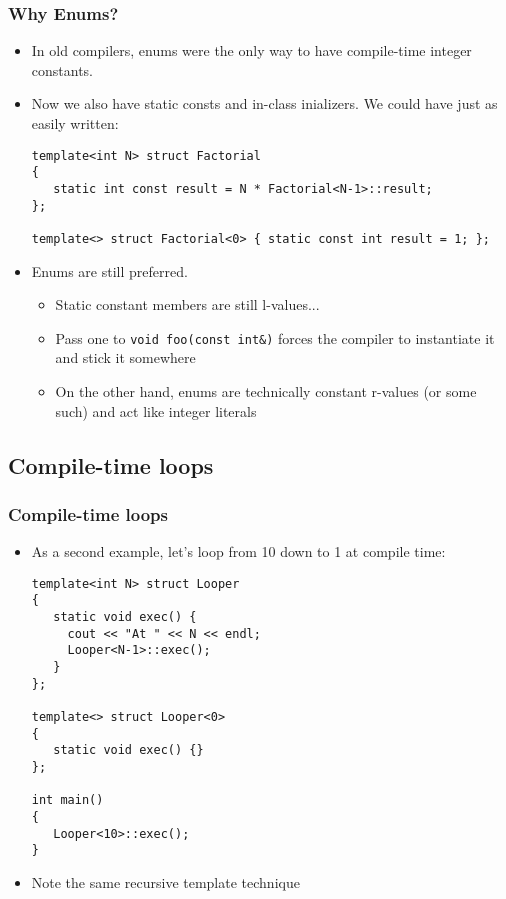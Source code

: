 \begin{frame}[fragile,t]
\frametitle{Why Enums?}
\begin{itemize}[<+->]
  \item In old compilers, enums were the only way to have compile-time
    integer constants.
  \item Now we also have static consts and in-class inializers.  We
    could have just as easily written:
{\scriptsize\begin{verbatim}
template<int N> struct Factorial
{
   static int const result = N * Factorial<N-1>::result;
};

template<> struct Factorial<0> { static const int result = 1; };

\end{verbatim}
}
\item Enums are still preferred.
\begin{itemize}
  \item Static constant members are still l-values...
  \item Pass one to \texttt{void foo(const int\&)} forces the compiler
    to instantiate it and stick it somewhere
  \item On the other hand, enums are technically constant r-values (or
    some such) and act like integer literals
\end{itemize}

\end{itemize}
\end{frame}

\subsection{Compile-time loops}

\begin{frame}[fragile,t]
\frametitle{Compile-time loops}
\begin{itemize}[<+->]
\item As a second example, let's loop from 10 down to 1 at compile
  time:
{\scriptsize\begin{verbatim}
template<int N> struct Looper
{
   static void exec() { 
     cout << "At " << N << endl;
     Looper<N-1>::exec();
   }
};

template<> struct Looper<0>
{
   static void exec() {}
};

int main()
{
   Looper<10>::exec();
}

\end{verbatim}
}

\item Note the same recursive template technique

\end{itemize}

\end{frame}


